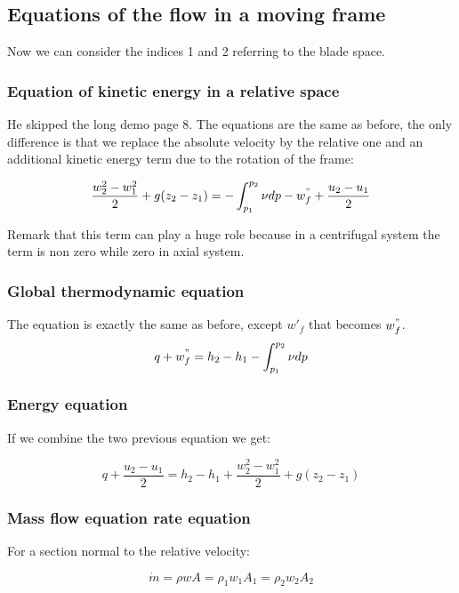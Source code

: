 \subsection{Equations of the flow in a moving frame}
Now we can consider the indices 1 and 2 referring to the blade space. 

\subsubsection{Equation of kinetic energy in a relative space}
He skipped the long demo page 8. The equations are the same as before, the only difference is that we replace the absolute velocity by the relative one and an additional kinetic energy term due to the rotation of the frame: 

\begin{equation}
 \frac{w_2^2 - w_1^2}{2} + g(z_2-z_1) = - \int _{p_1}^{p_2} \nu dp - w^"_f + \frac{u_2-u_1}{2}
 \label{2.5}
\end{equation}

Remark that this term can play a huge role because in a centrifugal system the term is non zero while zero in axial system. 

\subsubsection{Global thermodynamic equation}
The equation is exactly the same as before, except $w'_f$ that becomes $w^"_f$. 
\begin{equation}
q + w^"_f = h_2 - h_1 - \int _{p_1}^{p_2} \nu dp
\end{equation}

\subsubsection{Energy equation}
If we combine the two previous equation we get: 

\begin{equation}
q + \frac{u_2-u_1}{2} = h_2 - h_1 + \frac{w_2^2 - w_1^2}{2} + g(z_2-z_1)
\end{equation}

\subsubsection{Mass flow equation rate equation}
For a section normal to the relative velocity:

\begin{equation}
\dot{m} = \rho w A = \rho _1 w_1 A_1 = \rho _2 w_2 A_2
\end{equation}


